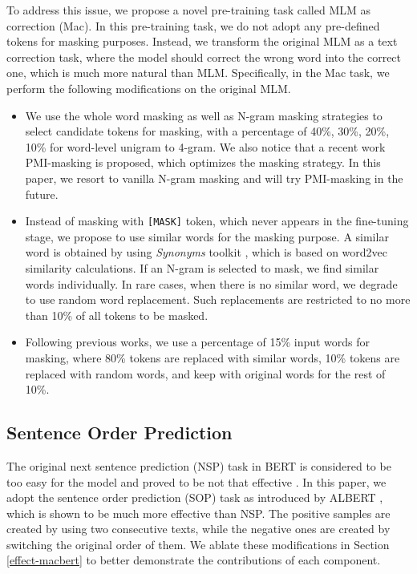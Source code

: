 \documentclass[journal]{IEEEtran}
\begin{document}
\begin{CJK*}{UTF8}{gbsn}
To address this issue, we propose a novel pre-training task called MLM as correction (Mac).
In this pre-training task, we do not adopt any pre-defined tokens for masking purposes.
Instead, we transform the original MLM as a text correction task, where the model should correct the wrong word into the correct one, which is much more natural than MLM.
Specifically, in the Mac task, we perform the following modifications on the original MLM.
\begin{itemize}
	\item We use the whole word masking as well as N-gram masking strategies to select candidate tokens for masking, with a percentage of 40\%, 30\%, 20\%, 10\% for word-level unigram to 4-gram. We also notice that a recent work PMI-masking \cite{levine2021pmimasking} is proposed, which optimizes the masking strategy. In this paper, we resort to vanilla N-gram masking and will try PMI-masking in the future.
	\item Instead of masking with {\tt [MASK]} token, which never appears in the fine-tuning stage, we propose to use similar words for the masking purpose. A similar word is obtained by using {\em Synonyms} toolkit \cite{Synonyms:hain2017}, which is based on word2vec \cite{mikolov-etal-2013} similarity calculations. If an N-gram is selected to mask, we find similar words individually. In rare cases, when there is no similar word, we degrade to use random word replacement. Such replacements are restricted to no more than 10\% of all tokens to be masked.
	\item Following previous works, we use a percentage of 15\% input words for masking, where 80\% tokens are replaced with similar words, 10\% tokens are replaced with random words, and keep with original words for the rest of 10\%.
\end{itemize}



\subsection{Sentence Order Prediction}
The original next sentence prediction (NSP) task in BERT is considered to be too easy for the model and proved to be not that effective \cite{liu2019roberta,lan2019albert}.
In this paper, we adopt the sentence order prediction (SOP) task as introduced by ALBERT \cite{lan2019albert}, which is shown to be much more effective than NSP.
The positive samples are created by using two consecutive texts, while the negative ones are created by switching the original order of them.
We ablate these modifications in Section \ref{effect-macbert} to better demonstrate the contributions of each component.



\end{CJK*}
\end{document}
